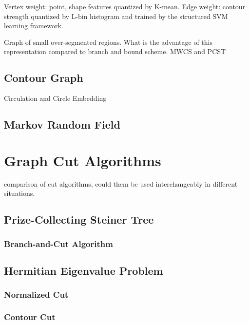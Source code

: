 \documentclass{SMBV12}
\begin{document}
\cite{arbelaez2009contours}

Vertex weight: point, shape features quantized by K-mean.
Edge weight: contour strength quantized by L-bin histogram and trained by the structured SVM learning framework.

Graph of small over-segmented regions. What is the advantage of this representation compared to branch and bound scheme. MWCS and PCST

\subsection{Contour Graph}

Circulation and Circle Embedding

\subsection{Markov Random Field}

\section{Graph Cut Algorithms}

comparison of cut algorithms, could them be used interchangeably in different situations.

\subsection{Prize-Collecting Steiner Tree}

\cite{ljubic2006algorithmic}

\subsubsection{Branch-and-Cut Algorithm}

\subsection{Hermitian Eigenvalue Problem}

\subsubsection{Normalized Cut}
\label{sec:normalized_cut}

\cite{shi2000normalized}

\subsubsection{Contour Cut}
\end{document}
